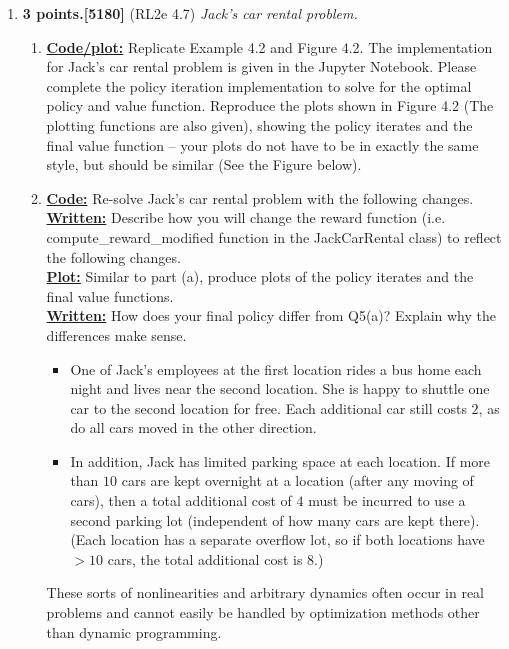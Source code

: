 \documentclass{article}
\begin{document}
\begin{enumerate}
	\item \textbf{3 points.[5180]} (RL2e 4.7) \textit{Jack's car rental problem.}
	      \begin{enumerate}
		      \item \uline{\textbf{Code/plot:}} Replicate Example 4.2 and Figure 4.2. The implementation for Jack's car rental problem is given in the Jupyter Notebook. Please complete the policy iteration implementation to solve for the optimal policy and value function. Reproduce the plots shown in Figure 4.2 (The plotting functions are also given), showing the policy iterates and the final value function -- your plots do not have to be in exactly the same style, but should be similar (See the Figure below).
		      \item \uline{\textbf{Code:}} Re-solve Jack's car rental problem with the following changes. \\
		            \uline{\textbf{Written:}} Describe how you will change the reward function (i.e. compute\_reward\_modified function in the JackCarRental class) to reflect the following changes. \\
		            \uline{\textbf{Plot:}} Similar to part (a), produce plots of the policy iterates and the final value functions. \\
		            \uline{\textbf{Written:}} How does your final policy differ from Q5(a)? Explain why the differences make sense.
		            \begin{itemize}
			            \item One of Jack's employees at the first location rides a bus home each night and lives near the second location. She is happy to shuttle one car to the second location for free. Each additional car still costs $2$, as do all cars moved in the other direction.
			            \item In addition, Jack has limited parking space at each location. If more than $10$ cars are kept overnight at a location (after any moving of cars), then a total additional cost of $4$ must be incurred to use a second parking lot (independent of how many cars are kept there). (Each location has a separate overflow lot, so if both locations have $> 10$ cars, the total additional cost is $8$.)
		            \end{itemize}
		            These sorts of nonlinearities and arbitrary dynamics often occur in real problems and cannot easily be handled by optimization methods other than dynamic programming.
	      \end{enumerate}


\end{enumerate}
\end{document}
